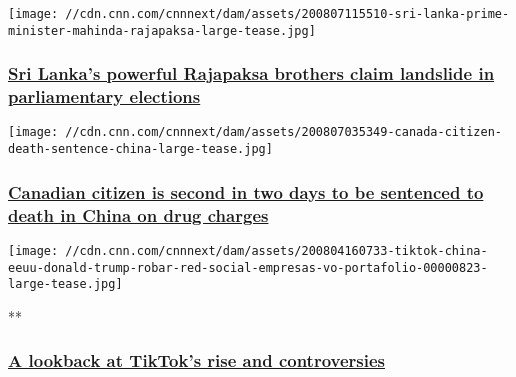 \texttt{[image: //cdn.cnn.com/cnnnext/dam/assets/200807115510-sri-lanka-prime-minister-mahinda-rajapaksa-large-tease.jpg]}

\hypertarget{sri-lankas-powerful-rajapaksa-brothers-claim-landslide-in-parliamentary-elections}{%
\subsubsection{\texorpdfstring{\href{/2020/08/07/asia/sri-lanka-election-mahinda-rajapaksa-intl-hnk/index.html}{Sri
Lanka's powerful Rajapaksa brothers claim landslide in parliamentary
elections}}{Sri Lanka's powerful Rajapaksa brothers claim landslide in parliamentary elections}}\label{sri-lankas-powerful-rajapaksa-brothers-claim-landslide-in-parliamentary-elections}}

\href{/2020/08/07/china/canada-citizen-death-sentence-china-intl-hnk/index.html}{}

\texttt{[image: //cdn.cnn.com/cnnnext/dam/assets/200807035349-canada-citizen-death-sentence-china-large-tease.jpg]}

\hypertarget{canadian-citizen-is-second-in-two-days-to-be-sentenced-to-death-in-china-on-drug-charges}{%
\subsubsection{\texorpdfstring{\href{/2020/08/07/china/canada-citizen-death-sentence-china-intl-hnk/index.html}{Canadian
citizen is second in two days to be sentenced to death in China on drug
charges}}{Canadian citizen is second in two days to be sentenced to death in China on drug charges}}\label{canadian-citizen-is-second-in-two-days-to-be-sentenced-to-death-in-china-on-drug-charges}}

\href{/videos/tech/2020/08/07/trump-us-ban-tiktok-china-gold-intl-hnk-vpx.cnn}{}

\texttt{[image: //cdn.cnn.com/cnnnext/dam/assets/200804160733-tiktok-china-eeuu-donald-trump-robar-red-social-empresas-vo-portafolio-00000823-large-tease.jpg]}

**

\hypertarget{a-lookback-at-tiktoks-rise-and-controversies}{%
\subsubsection{\texorpdfstring{\href{/videos/tech/2020/08/07/trump-us-ban-tiktok-china-gold-intl-hnk-vpx.cnn}{A
lookback at TikTok's rise and
controversies}}{A lookback at TikTok's rise and controversies}}\label{a-lookback-at-tiktoks-rise-and-controversies}}

